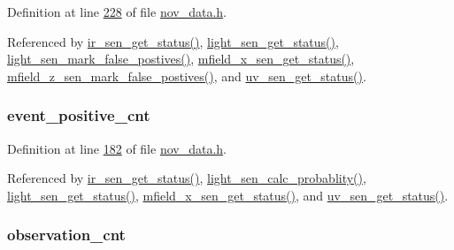 Definition at line \hyperlink{a00022_source_l00228}{228} of file \hyperlink{a00022_source}{nov\+\_\+data.\+h}.



Referenced by \hyperlink{a00045_source_l00302}{ir\+\_\+sen\+\_\+get\+\_\+status()}, \hyperlink{a00047_source_l00204}{light\+\_\+sen\+\_\+get\+\_\+status()}, \hyperlink{a00047_source_l00491}{light\+\_\+sen\+\_\+mark\+\_\+false\+\_\+postives()}, \hyperlink{a00050_source_l00276}{mfield\+\_\+x\+\_\+sen\+\_\+get\+\_\+status()}, \hyperlink{a00053_source_l00747}{mfield\+\_\+z\+\_\+sen\+\_\+mark\+\_\+false\+\_\+postives()}, and \hyperlink{a00073_source_l00302}{uv\+\_\+sen\+\_\+get\+\_\+status()}.

\hypertarget{a00028_a7397b9d76d4b57500f27bb23d258a18a}{
\subsubsection[{event\+\_\+positive\+\_\+cnt}]{ event\+\_\+positive\+\_\+cnt}}\label{a00028_a7397b9d76d4b57500f27bb23d258a18a}


Definition at line \hyperlink{a00022_source_l00182}{182} of file \hyperlink{a00022_source}{nov\+\_\+data.\+h}.



Referenced by \hyperlink{a00045_source_l00302}{ir\+\_\+sen\+\_\+get\+\_\+status()}, \hyperlink{a00047_source_l00184}{light\+\_\+sen\+\_\+calc\+\_\+probablity()}, \hyperlink{a00047_source_l00204}{light\+\_\+sen\+\_\+get\+\_\+status()}, \hyperlink{a00050_source_l00276}{mfield\+\_\+x\+\_\+sen\+\_\+get\+\_\+status()}, and \hyperlink{a00073_source_l00302}{uv\+\_\+sen\+\_\+get\+\_\+status()}.

\hypertarget{a00028_ad5b0bac02ce266b91b2b52a1c3ea1d78}{
\subsubsection[{observation\+\_\+cnt}]{ observation\+\_\+cnt}}\label{a00028_ad5b0bac02ce266b91b2b52a1c3ea1d78}


